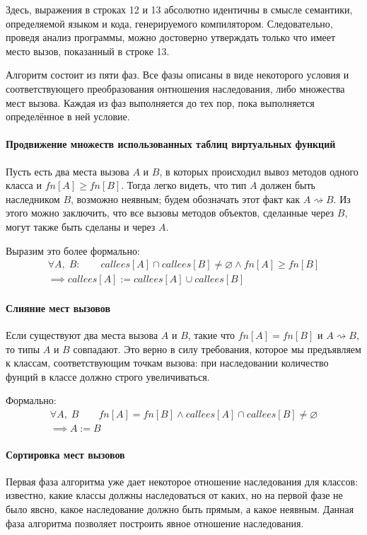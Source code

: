 \documentclass[a4paper,12pt,russian]{article}
\newcommand{\code}[1]{\textsf{#1}}
\begin{document}
Здесь, выражения в строках \code{12} и \code{13} абсолютно идентичны в смысле семантики, определяемой языком и кода, генерируемого компилятором.
Следовательно, проведя анализ программы, можно достоверно утверждать только что имеет место вызов, показанный в строке \code{13}.

Алгоритм состоит из пяти фаз.
Все фазы описаны в виде некоторого условия и соответствующего преобразования онтношения наследования, либо множества мест вызова.
Каждая из фаз выполняется до тех пор, пока выполняется определённое в ней условие.

\paragraph{Продвижение множеств использованных таблиц виртуальных функций}
Пусть есть два места вызова $A$ и $B$, в которых происходил вывоз методов одного класса и $fn[A] \geq fn[B]$.
Тогда легко видеть, что тип $A$ должен быть наследником $B$, возможно неявным; будем обозначать этот факт как $A \rightsquigarrow B$.
Из этого можно заключить, что все вызовы методов объектов, сделанные через $B$, могут также быть сделаны и через $A$.

Выразим это более формально:
\begin{eqnarray*}
\forall A,\;B:\qquad callees[A] \cap callees[B] \neq \varnothing \wedge fn[A] \geq fn[B]\\
\implies callees[A] := callees[A] \cup callees[B]
\end{eqnarray*}

\paragraph{Слияние мест вызовов}
Если существуют два места вызова $A$ и $B$, такие что $fn[A] = fn[B]$ и $A \rightsquigarrow B$, то типы $A$ и $B$ совпадают.
Это верно в силу требования, которое мы предъявляем к классам, соответствующим точкам вызова: при наследовании количество фунций в классе должно строго увеличиваться.

Формально:
\begin{eqnarray*}
\forall A,\;B\qquad fn[A] = fn[B] \wedge callees[A] \cap callees[B] \neq \varnothing\\
\implies A := B
\end{eqnarray*}

\paragraph{Сортировка мест вызовов}
Первая фаза алгоритма уже дает некоторое отношение наследования для классов: известно, какие классы должны наследоваться от каких, но на первой фазе не было явсно, какое наследование должно быть прямым, а какое неявным. Данная фаза алгоритма позволяет построить явное отношение наследования.
\end{document}
